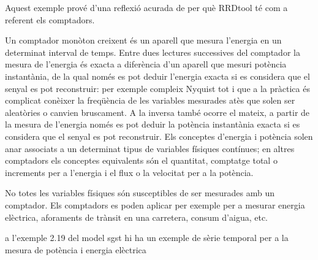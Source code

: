 \begin{example}
\begin{itemize}
\end{itemize}




\end{example}











\begin{example}
  \label{ex:multiresolucio:comptadors}

  Aquest exemple prové d'una reflexió acurada de per què RRDtool té
  com a referent els comptadors.




  Un comptador monòton creixent és un aparell que mesura l'energia en
  un determinat interval de temps. Entre dues lectures successives del
  comptador la mesura de l'energia és exacta a diferència d'un aparell
  que mesuri potència instantània, de la qual només es pot deduir
  l'energia exacta si es considera que el senyal es pot reconstruir:
  per exemple compleix Nyquist tot i que a la pràctica és
  complicat conèixer la freqüència de les variables mesurades atès que
  solen ser aleatòries o canvien bruscament. A la inversa també ocorre
  el mateix, a partir de la mesura de l'energia només es pot deduir la
  potència instantània exacta si es considera que el senyal es pot
  reconstruir.  Els conceptes d'energia i potència solen anar
  associats a un determinat tipus de variables físiques contínues; en
  altres comptadors els conceptes equivalents són el quantitat,
  comptatge total o increments per a l'energia i el flux o la
  velocitat per a la potència.



  No totes les variables físiques són susceptibles de ser mesurades
  amb un comptador. Els comptadors es poden aplicar per exemple per a
  mesurar energia elèctrica, aforaments de trànsit en una carretera, consum
  d'aigua, etc.
  
   a l'exemple 2.19 %
 del model sgst hi ha un exemple de sèrie temporal per a la mesura de potència i energia elèctrica 



\end{example}
